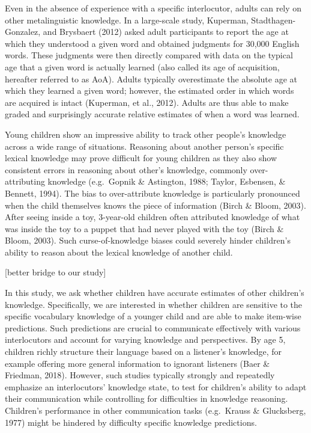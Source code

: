 \documentclass[10pt, letterpaper]{article}
\begin{document}
Even in the absence of experience with a specific interlocutor, adults
can rely on other metalinguistic knowledge. In a large-scale study,
Kuperman, Stadthagen-Gonzalez, and Brysbaert (2012) asked adult
participants to report the age at which they understood a given word and
obtained judgments for 30,000 English words. These judgments were then
directly compared with data on the typical age that a given word is
actually learned (also called its age of acquisition, hereafter referred
to as AoA). Adults typically overestimate the absolute age at which they
learned a given word; however, the estimated order in which words are
acquired is intact (Kuperman, et al., 2012). Adults are thus able to
make graded and surprisingly accurate relative estimates of when a word
was learned.

Young children show an impressive ability to track other people's
knowledge across a wide range of situations. Reasoning about another
person's specific lexical knowledge may prove difficult for young
children as they also show consistent errors in reasoning about other's
knowledge, commonly over-attributing knowledge (e.g.~Gopnik \&
Astington, 1988; Taylor, Esbensen, \& Bennett, 1994). The bias to
over-attribute knowledge is particularly pronounced when the child
themselves knows the piece of information (Birch \& Bloom, 2003). After
seeing inside a toy, 3-year-old children often attributed knowledge of
what was inside the toy to a puppet that had never played with the toy
(Birch \& Bloom, 2003). Such curse-of-knowledge biases could severely
hinder children's ability to reason about the lexical knowledge of
another child.

{[}better bridge to our study{]}

In this study, we ask whether children have accurate estimates of other
children's knowledge. Specifically, we are interested in whether
children are sensitive to the specific vocabulary knowledge of a younger
child and are able to make item-wise predictions. Such predictions are
crucial to communicate effectively with various interlocutors and
account for varying knowledge and perspectives. By age 5, children
richly structure their language based on a listener's knowledge, for
example offering more general information to ignorant listeners (Baer \&
Friedman, 2018). However, such studies typically strongly and repeatedly
emphasize an interlocutors' knowledge state, to test for children's
ability to adapt their communication while controlling for difficulties
in knowledge reasoning. Children's performance in other communication
tasks (e.g.~Krauss \& Glucksberg, 1977) might be hindered by difficulty
specific knowledge predictions.
\end{document}
